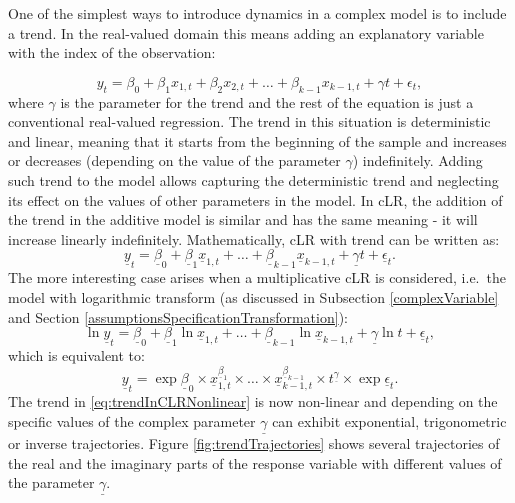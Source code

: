 \documentclass[
]{book}
\begin{document}
One of the simplest ways to introduce dynamics in a complex model is to include a trend. In the real-valued domain this means adding an explanatory variable with the index of the observation:

\begin{equation}
    {y}_t = {\beta}_0 + {\beta}_1 {x}_{1,t} + {\beta}_2 {x}_{2,t} + \dots + {\beta}_{k-1} {x}_{k-1,t} + \gamma t + {\epsilon}_t,
    \label{eq:trendInRealModel}
\end{equation}
where \(\gamma\) is the parameter for the trend and the rest of the equation is just a conventional real-valued regression. The trend in this situation is deterministic and linear, meaning that it starts from the beginning of the sample and increases or decreases (depending on the value of the parameter \(\gamma\)) indefinitely. Adding such trend to the model allows capturing the deterministic trend and neglecting its effect on the values of other parameters in the model. In cLR, the addition of the trend in the additive model is similar and has the same meaning - it will increase linearly indefinitely. Mathematically, cLR with trend can be written as:
\begin{equation}
    \underline{y}_t = \underline{\beta}_0 + \underline{\beta}_1 \underline{x}_{1,t} + \dots + \underline{\beta}_{k-1} \underline{x}_{k-1,t} + \underline{\gamma} t + \underline{\epsilon}_t .
    \label{eq:trendInCLR}
\end{equation}
The more interesting case arises when a multiplicative cLR is considered, i.e.~the model with logarithmic transform (as discussed in Subsection \ref{complexVariable} and Section \ref{assumptionsSpecificationTransformation}):
\begin{equation}
    \ln \underline{y}_t = \underline{\beta}_0 + \underline{\beta}_1 \ln \underline{x}_{1,t} + \dots + \underline{\beta}_{k-1} \ln \underline{x}_{k-1,t} + \underline{\gamma} \ln t + \underline{\epsilon}_t ,
    \label{eq:trendInCLRLogs}
\end{equation}
which is equivalent to:
\begin{equation}
    \underline{y}_t = \exp \underline{\beta}_0 \times \underline{x}_{1,t}^{\underline{\beta}_1} \times \dots \times \underline{x}_{k-1,t}^{\underline{\beta}_{k-1}} \times t^{\underline{\gamma}} \times \exp \underline{\epsilon}_t .
    \label{eq:trendInCLRNonlinear}
\end{equation}
The trend in \eqref{eq:trendInCLRNonlinear} is now non-linear and depending on the specific values of the complex parameter \(\underline{\gamma}\) can exhibit exponential, trigonometric or inverse trajectories. Figure \ref{fig:trendTrajectories} shows several trajectories of the real and the imaginary parts of the response variable with different values of the parameter \(\underline{\gamma}\).
\end{document}
